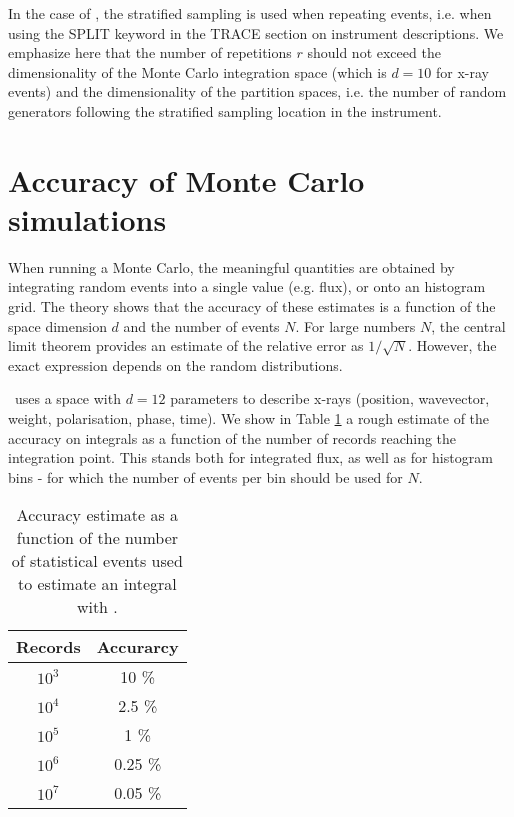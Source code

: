 In the case of \MCX, the stratified sampling is used when repeating events, i.e. when using the SPLIT
keyword in the TRACE section on instrument descriptions. We emphasize here that
the number of repetitions $r$ should not exceed the dimensionality of the Monte
Carlo integration space (which is $d=10$ for x-ray events) and the
dimensionality of the partition spaces, i.e. the number of random generators
following the stratified sampling location in the instrument.

\section{Accuracy of Monte Carlo simulations}

When running a Monte Carlo, the meaningful quantities are obtained by
integrating random events into a single value (e.g. flux), or onto an histogram
grid. The theory \cite{James80} shows that the accuracy of these estimates is a
function of the space dimension $d$ and the number of events $N$. For large
numbers $N$, the central limit theorem provides an estimate of the relative
error as $1/\sqrt{N}$. However, the exact expression depends on the random
distributions.

\MCX\ uses a space with $d=12$ parameters to describe x-rays (position,
wavevector, weight, polarisation, phase, time). We show in Table \ref{t:mc_accuracy} a rough estimate of
the accuracy on integrals as a function of the number of records reaching the
integration point. This stands both for integrated flux, as well as for
histogram bins - for which the number of events per bin should be used for $N$.

\begin{table}
  \begin{center}
  {\let\my=\\
    \begin{tabular}{|c|c|}
    \hline
    Records       & Accurarcy \\
    \hline
    $10^3$ & 10 \% \\
    $10^4$ & 2.5 \% \\
    $10^5$ & 1 \% \\
    $10^6$ & 0.25 \% \\
    $10^7$ & 0.05 \% \\
    \hline
    \end{tabular}
    \caption{Accuracy estimate as a function of the number of statistical events used to estimate an integral with \MCX.}
    \label{t:mc_accuracy}
  }
  \end{center}
\end{table}

